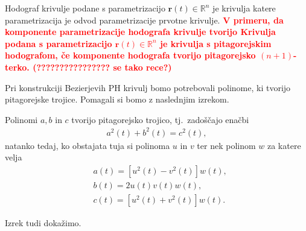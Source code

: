 \documentclass[isrm2, tisk]{fmfdelo}
\newcommand{\R}{\mathbb R}
\newcommand{\mycomment}[1]{\textbf{\textcolor{red}{#1}}}
\begin{document}
    \begin{definicija}
        Hodograf krivulje podane s parametrizacijo $\mathbf{r}(t)\in \R^n$ je krivulja katere parametrizacija je odvod parametrizacije prvotne krivulje.
        \mycomment{V primeru, da komponente parametrizacije hodografa krivulje tvorijo
        Krivulja podana s parametrizacijo $\mathbf{r}(t)\in \R^n$ je krivulja s pitagorejskim hodografom, če komponente hodografa tvorijo pitagorejsko $(n+1)$-terko. (???????????????? se tako rece?)}
    \end{definicija}

    Pri konstrukciji Bezierjevih PH krivulj bomo potrebovali polinome, ki tvorijo pitagorejske trojice.
    Pomagali si bomo z naslednjim izrekom.

    \begin{izrek}              %
        Polinomi $a,b$ in $c$ tvorijo pitagorejsko trojico, tj.\ zadoščajo enačbi
        \vspace{-0.3cm}
        \begin{align}
            a^2(t)+b^2(t)=c^2(t), \label{eq:abc}
        \end{align}
        natanko tedaj, ko obstajata tuja si polinoma $u$ in $v$ ter nek polinom  $w$ za katere velja
        \vspace{-0.3cm}
        \begin{align}
            &a(t)=[u^2(t)-v^2(t)]w(t), \nonumber \\
            &b(t)=2u(t)v(t)w(t),        \nonumber \\
            &c(t)=[u^2(t)+v^2(t)]w(t). \label{eq:uvw}
        \end{align}
    \end{izrek}

    Izrek tudi dokažimo.
\end{document}
